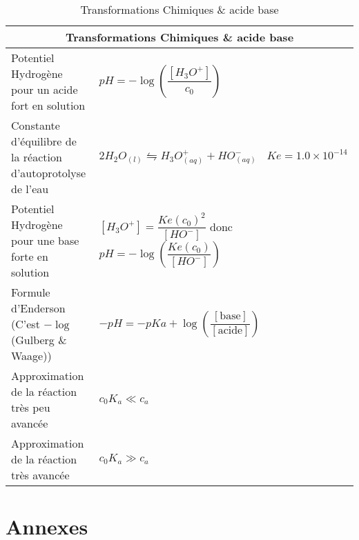 \documentclass[10pt,a4paper,titlepage,landscape]{article}
\renewcommand{\arraystretch}{2}
\begin{document}
\begin{table}[H]
    \centering
    \renewcommand{\arraystretch}{1.5} %
    \setlength{\tabcolsep}{8pt} %
    \begin{tabular}{@{}|p{9cm}|p{10cm}@{}|}

        \multicolumn{2}{c}{\textbf{Transformations Chimiques \& acide base}} \\ \hline


        Potentiel Hydrogène pour un acide fort en solution & $pH = -\log\left(\dfrac{[H_3O^+]}{c_0}\right)$ \\ \hline
        Constante d'équilibre de la réaction d'autoprotolyse de l'eau & $2H_2 O_{(l)} \leftrightharpoons H_3O^+_{(aq)} + HO^-_{(aq)} \ \ \ \ Ke = 1.0\times10^{-14}$ \\ \hline
        Potentiel Hydrogène pour une base forte en solution & $[H_3O^+] = \dfrac{Ke(c_0)^2}{[HO^-]}$ donc $pH = -\log\left(\dfrac{Ke(c_0)}{[HO^-]}\right)$ \\ \hline
        Formule d'Enderson (C'est $-\log$(Gulberg \& Waage)) & $-pH = -pKa + \log\left(\dfrac{[\text{base}]}{[\text{acide}]}\right)$ \\ \hline
        Approximation de la réaction très peu avancée & $c_0K_a \ll c_a$ \\ \hline
        Approximation de la réaction très avancée & $c_0K_a \gg c_a$ \\ \hline
\end{tabular}
\caption{Transformations Chimiques \& acide base}
\label{tab:chem}
\end{table}


\section{Annexes}
\end{document}
